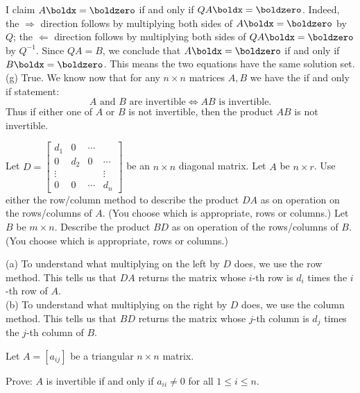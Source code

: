 \begin{solution}
I claim $A\boldx=\boldzero$ if and only if $QA\boldx=\boldzero$. Indeed, the $\Rightarrow$ direction follows by multiplying both sides of $A\boldx=\boldzero$ by $Q$; the $\Leftarrow$ direction follows by multiplying both sides of $QA\boldx=\boldzero$ by $Q^{-1}$. Since $QA=B$, we conclude that $A\boldx=\boldzero$ if and only if $B\boldx=\boldzero$. This means the two equations have the same solution set.
\\
(g)
True.
We know now that for any $n\times n$ matrices $A,B$ we have the if and only if statement:
\[
A \text{ and } B \text{ are invertible}\Leftrightarrow AB \text{ is invertible.}
\]
Thus if either one of $A$ or $B$ is not invertible, then the product $AB$ is not invertible.
\end{solution}
\ii \label{ex:diag} Let $D=\begin{bmatrix}d_1&0&\cdots\\ 0&d_2&0&\cdots\\ \vdots & & &\vdots\\ 0&0&\cdots & d_n \end{bmatrix}$ be an $n\times n$ diagonal matrix.
\bb
\ii Let $A$ be $n\times r$. Use either the row/column method to describe the product $DA$ as on operation on the rows/columns of $A$. (You choose which is appropriate, rows or columns.)
\ii Let $B$ be $m\times n$. Describe the product $BD$ as on operation of the rows/columns of $B$. (You choose which is appropriate, rows or columns.)
\ee
\begin{solution}\noindent
(a) To understand what multiplying on the left by $D$ does, we use the row method. This tells us that $DA$ returns the matrix whose $i$-th row is $d_i$ times the $i$-th row of $A$.
\\
(b) To understand what multiplying on the right by $D$ does, we use the column method. This tells us that $BD$ returns the matrix whose $j$-th column is $d_j$ times the $j$-th column of $B$.
\end{solution}
\ii Let $A=[a_{ij}]$ be a triangular $n\times n$ matrix.

Prove: $A$ is invertible if and only if $a_{ii}\ne 0$ for all $1\leq i\leq n$.

